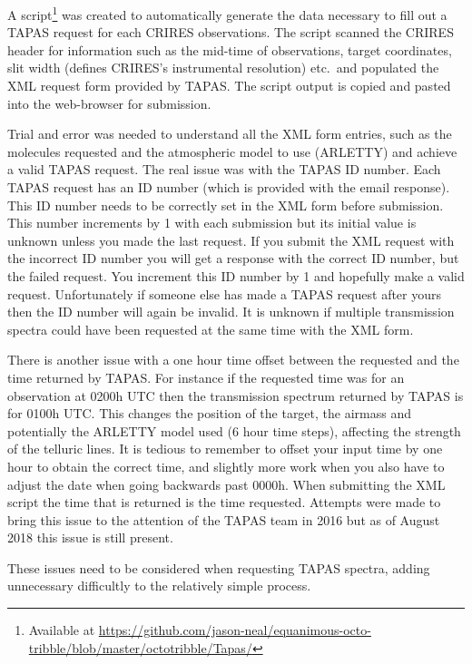 A script\footnote{Available at \href{https://github.com/jason-neal/equanimous-octo-tribble/blob/master/octotribble/Tapas/}{https://github.com/jason-neal/equanimous-octo-tribble/blob/master/octotribble/Tapas/}} was created to automatically generate the data necessary to fill out a {TAPAS} request for each {CRIRES} observations.
The script scanned the {CRIRES} header for information such as the mid-time of observations, target coordinates, slit width (defines {CRIRES}'s instrumental resolution) etc.\ and populated the {XML} request form provided by {TAPAS}.
The script output is copied and pasted into the web-browser for submission.

Trial and error was needed to understand all the {XML} form entries, such as the molecules requested and the atmospheric model to use ({ARLETTY}) and achieve a valid {TAPAS} request.
The real issue was with the {TAPAS} {{ID}} number.
Each {TAPAS} request has an {ID} number (which is provided with the email response).
This {ID} number needs to be correctly set in the {XML} form before submission.
This number increments by 1 with each submission but its initial value is unknown unless you made the last request.
If you submit the {XML} request with the incorrect {ID} number you will get a response with the correct {ID} number, but the failed request.
You increment this {ID} number by 1 and hopefully make a valid request.
Unfortunately if someone else has made a {TAPAS} request after yours then the {ID} number will again be invalid.
It is unknown if multiple transmission spectra could have been requested at the same time with the {XML} form.

There is another issue with a one hour time offset between the requested and the time returned by {TAPAS}.
For instance if the requested time was for an observation at 0200h {UTC} then the transmission spectrum returned by {TAPAS} is for 0100h {UTC}.
This changes the position of the target, the airmass and potentially the {ARLETTY} model used (6 hour time steps), affecting the strength of the telluric lines.
It is tedious to remember to offset your input time by one hour to obtain the correct time, and slightly more work when you also have to adjust the date when going backwards past 0000h.
When submitting the {XML} script the time that is returned is the time requested.
Attempts were made to bring this issue to the attention of the {TAPAS} team in 2016 but as of August 2018 this issue is still present.

These issues need to be considered when requesting {TAPAS} spectra, adding unnecessary difficultly to the relatively simple process.


